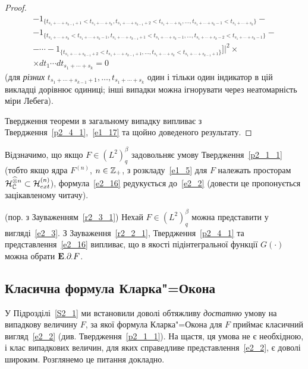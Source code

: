 \begin{proof}
\begin{gather*}
-1_{\{t_{s_1+\cdots+s_{k-1}+1}<t_{s_1+\cdots+s_k},
t_{s_1+\cdots+s_{k-1}+2}<t_{s_1+\cdots+s_k},\dots,
t_{s_1+\cdots+s_k-1}<t_{s_1+\cdots+s_k}\}}-\\
-1_{\{t_{s_1+\cdots+s_k}<t_{s_1+\cdots+s_k-1},
t_{s_1+\cdots+s_{k-1}+1}<t_{s_1+\cdots+s_k-1},\dots,
t_{s_1+\cdots+s_k-2}<t_{s_1+\cdots+s_k-1}\}}-\\
-\cdots -1_{\{t_{s_1+\cdots+s_{k-1}+2}<t_{s_1+\cdots+s_{k-1}+1},\dots,
t_{s_1+\cdots+s_k}<t_{s_1+\cdots+s_{k-1}+1}\}}]\big|^2\times\\
\times dt_1\cdots dt_{s_1+\cdots+s_k}=0
\end{gather*}
(для {\it різних} $t_{s_1+\cdots+s_{k-1}+1},\dots,t_{s_1+\cdots+s_k}$ один і тільки один
індикатор в цій викладці дорівнює одиниці; інші випадки можна ігнорувати через неатомарність
міри Лебега).

Твердження теореми в загальному випадку випливає з Твердження~\ref{p2_4_1},~\eqref{e1_17} та
щойно доведеного результату.
\end{proof}

Відзначимо, що якщо $F\in (L^2)^\beta_q$ задовольняє умову Твердження~\ref{p2_1_1} (тобто
якщо ядра $F^{(n)}$, $n\in\mathbb{Z}_+$, з розкладу~\eqref{e1_5} для $F$ належать просторам
$\mathcal{H}_{\mathbb{C}}^{\widehat\otimes n}\subset\mathcal{H}_{ext}^{(n)}$), формула~\eqref{e2_16}
редукується до~\eqref{e2_2} (довести це пропонується зацікавленому читачу).

\begin{subremark}\label{r2_4_1}{\rm (пор. з Зауваженням~\ref{r2_3_1})}
Нехай $F\in (L^2)^\beta_q$ можна представити у вигляді~\eqref{e2_3}.
З Зауваження~\ref{r2_2_1}, Твердження~\ref{p2_4_1} та представлення~\eqref{e2_16} випливає, що в
якості підінтегральної функції $G(\cdot)$ можна обрати $\mathbf{E}_\cdot\partial_\cdot F$.
\end{subremark}

\subsection{Класична формула Кларка"=Окона}
У Підрозділі~\ref{S2_1} ми встановили доволі обтяжливу {\it достатню} умову на випадкову
величину $F$, за якої формула Кларка"=Окона для $F$ приймає класичний вигляд~\eqref{e2_2}
(див. Твердження~\ref{p2_1_1}). На щастя, ця умова не є необхідною, і клас випадкових величин,
для яких справедливе представлення~\eqref{e2_2}, є доволі широким. Розглянемо це питання
докладно.

